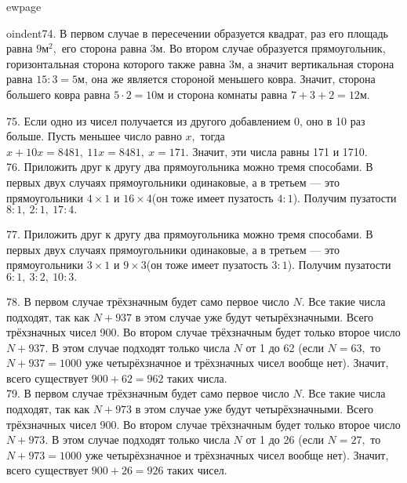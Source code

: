 ewpage

oindent74. В первом случае в пересечении образуется квадрат, раз его площадь равна $9\text{м}^2,$ его сторона равна 3м. Во втором случае образуется прямоугольник, горизонтальная сторона которого также равна 3м, а значит вертикальная сторона равна $15:3=5$м, она же является стороной меньшего ковра. Значит, сторона большего ковра равна $5\cdot2=10$м и сторона комнаты равна $7+3+2=12$м.
\begin{center}
\begin{figure}[ht!]
\end{figure}
\end{center}
75. Если одно из чисел получается из другого добавлением 0, оно в 10 раз больше. Пусть меньшее число равно $x,$ тогда $x+10x=8481,\ 11x=8481,\ x=171.$ Значит, эти числа равны 171 и 1710.\\
76. Приложить друг к другу два прямоугольника можно тремя способами. В первых двух случаях прямоугольники одинаковые, а в третьем --- это прямоугольники $4\times1$ и $16\times4$(он тоже имеет пузатость $4:1$). Получим пузатости $8:1,\ 2:1,\ 17:4.$
\begin{center}
\begin{figure}[ht!]
\end{figure}
\end{center}
77. Приложить друг к другу два прямоугольника можно тремя способами. В первых двух случаях прямоугольники одинаковые, а в третьем --- это прямоугольники $3\times1$ и $9\times3$(он тоже имеет пузатость $3:1$). Получим пузатости $6:1,\ 3:2,\ 10:3.$
\begin{center}
\begin{figure}[ht!]
\end{figure}
\end{center}
78. В первом случае трёхзначным будет само первое число $N.$ Все такие числа подходят, так как $N+937$ в этом случае уже будут четырёхзначными. Всего трёхзначных чисел 900. Во втором случае трёхзначным будет только второе число $N+937.$ В этом случае подходят только числа $N$ от 1 до 62 (если $N=63,$ то $N+937=1000$ уже четырёхзначное и трёхзначных чисел вообще нет). Значит, всего существует $900+62=962$ таких числа.\\
79. В первом случае трёхзначным будет само первое число $N.$ Все такие числа подходят, так как $N+973$ в этом случае уже будут четырёхзначными. Всего трёхзначных чисел 900. Во втором случае трёхзначным будет только второе число $N+973.$ В этом случае подходят только числа $N$ от 1 до 26 (если $N=27,$ то $N+973=1000$ уже четырёхзначное и трёхзначных чисел вообще нет). Значит, всего существует $900+26=926$ таких чисел.\\
